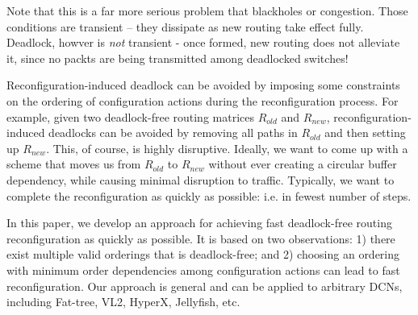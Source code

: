 Note that this is a far more serious problem that blackholes or congestion.
Those conditions are transient -- they dissipate as new routing take effect
fully. Deadlock, howver is {\em not} transient - once formed, new routing does
not alleviate it, since no packts are being transmitted among deadlocked
switches!

Reconfiguration-induced deadlock can be avoided by imposing some constraints on
the ordering of configuration actions during the reconfiguration process. For
example, given two deadlock-free routing matrices $R_{old}$ and $R_{new}$,
reconfiguration-induced deadlocks can be avoided by removing all paths in
$R_{old}$ and then setting up $R_{new}$. This, of course, is highly disruptive.
Ideally, we want to come up with a scheme that moves us from $R_{old}$ to
$R_{new}$ without ever creating a circular buffer dependency, while causing
minimal disruption to traffic. Typically, we want to complete the
reconfiguration as quickly as possible: i.e. in fewest number of steps. 

In this paper, we  develop an approach for achieving fast deadlock-free routing
reconfiguration as quickly as possible. It is based on two observations: 1)
there exist multiple  valid orderings that is deadlock-free; and 2) choosing an
ordering with minimum order dependencies among configuration actions can lead to
fast reconfiguration. Our approach is general and can be applied to arbitrary
DCNs, including Fat-tree, VL2, HyperX, Jellyfish, etc. 
